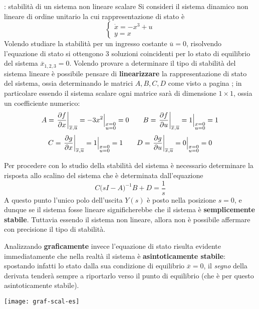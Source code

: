 		\begin{esempio}{: stabilità di un sistema non lineare scalare}
			Si consideri il sistema dinamico non lineare di ordine unitario la cui rappresentazione di stato è
			\[ \begin{cases}
				\dot x = - x^3 + u \\ y = x
			\end{cases} \]
			Volendo studiare la stabilità per un ingresso costante $\overline u = 0$, risolvendo l'equazione di stato si ottengono 3 soluzioni coincidenti per lo stato di equilibrio del sistema $\overline x_{1,2,3} = 0$. Volendo provare a determinare il tipo di stabilità del sistema lineare è possibile pensare di \textbf{linearizzare} la rappresentazione di stato del sistema, ossia determinando le matrici $A,B,C,D$ come visto a pagina \pageref{sec:intro:linearizzazione}; in particolare essendo il sistema scalare ogni matrice sarà di dimensione $1\times 1$, ossia un coefficiente numerico:
			\[ A = \left. \frac{\partial f}{\partial x}\right|_{\overline x,\overline u} = - 3x^2 \Big|_{\substack{x = 0 \\ u = 0}} = 0 \qquad
			B = \left. \frac{\partial f}{\partial u}\right|_{\overline x,\overline u} = 1 \Big|_{\substack{x = 0 \\ u = 0}} = 1 \]
			\[ C = \left. \frac{\partial g}{\partial x}\right|_{\overline x,\overline u} = 1 \Big|_{\substack{x = 0 \\ u = 0}} = 1 \qquad 
			D = \left. \frac{\partial g}{\partial u}\right|_{\overline x,\overline u} = 0 \Big|_{\substack{x = 0 \\ u = 0}} = 0 \]
			
			Per procedere con lo studio della stabilità del sistema è necessario determinare la risposta allo scalino del sistema che è determinata dall'equazione
			\[ C\big(sI-A\big)^{-1} B +  D = \frac 1 s \]
			A questo punto l'unico polo dell'uscita $Y(s)$ è posto nella posizione $s=0$, e dunque se il sistema fosse lineare significherebbe che il sistema è \textbf{semplicemente stabile}. Tuttavia essendo il sistema non lineare, allora non è possibile affermare con precisione il tipo di stabilità. 
			\begin{multicols}{2}
			Analizzando \textbf{graficamente} invece l'equazione di stato risulta evidente immediatamente che nella realtà il sistema è \textbf{asintoticamente stabile}: spostando infatti lo stato dalla sua condizione di equilibrio $\overline x=0$, il \textit{segno} della derivata tenderà sempre a riportarlo verso il punto di equilibrio (che è per questo asintoticamente stabile).
			
			\begin{center}
				\texttt{[image: graf-scal-es]}
			\end{center}
		\end{multicols}
		
		\end{esempio}
		
		
		
		
	